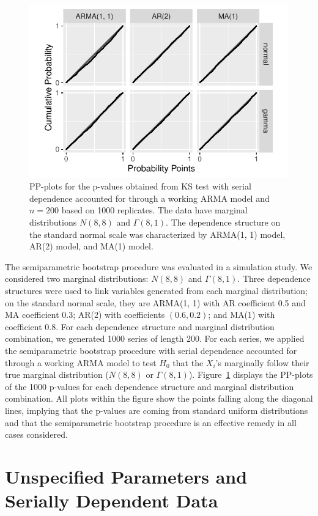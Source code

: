 \documentclass[12pt, letterpaper]{article}
\begin{document}
		
\begin{figure}[tbp]
  \centering
  \includegraphics[width=.75\textwidth]{pp_ss.pdf}
  \caption{PP-plots for the p-values obtained from KS test with serial
    dependence accounted for through a working ARMA model and $n = 200$ based on
    1000 replicates. The data have marginal distributions $N(8, 8)$ and
    $\Gamma(8, 1)$. The dependence structure on the standard normal scale was
    characterized by ARMA(1, 1) model, AR(2) model, and MA(1) model.
  }
  \label{fig:pp_ss}
\end{figure}


The semiparametric bootstrap procedure was evaluated in a simulation study. We
considered two marginal distributions: $N(8,8)$ and $\Gamma(8,1)$. Three
dependence structures were used to link variables generated from each marginal
distribution; on the standard normal scale, they are
ARMA(1, 1) with AR coefficient 0.5 and MA coefficient 0.3;
AR(2) with coefficients $(0.6, 0.2)$; and
MA(1) with coefficient 0.8.
For each dependence structure and marginal distribution combination, we
generated 1000 series of length 200.  For each series, we applied the
semiparametric bootstrap procedure with serial
dependence accounted for through a working ARMA model to test $H_0$ that the 
$X_i$'s marginally follow their true marginal distribution ($N(8, 8)$ or 
$\Gamma(8,1)$). Figure~\ref{fig:pp_ss} displays the PP-plots of the 1000 
p-values for each dependence structure and marginal distribution combination.
All plots within the figure show the points falling along the diagonal lines, 
implying that the p-values are coming from standard uniform distributions and 
that the semiparametric bootstrap procedure is an effective remedy in all cases
considered.

\section{Unspecified Parameters and Serially Dependent Data}
\label{sec:fittedwithdependence}
\end{document}
